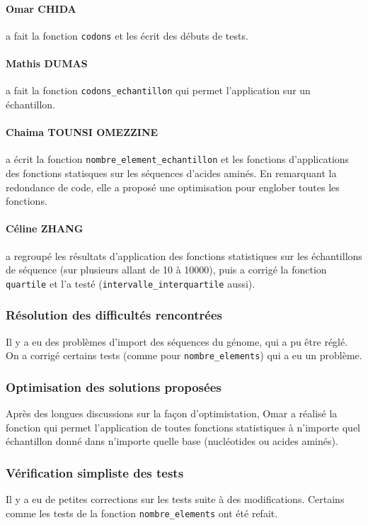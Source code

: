 \paragraph*{Omar CHIDA} a fait la fonction \texttt{codons} et les écrit des débuts de tests.

\paragraph*{Mathis DUMAS} a fait la fonction \texttt{codons\_echantillon} qui permet l'application sur un échantillon.

\paragraph*{Chaima TOUNSI OMEZZINE} a écrit la fonction \texttt{nombre\_element\_echantillon} et les fonctions d'applications des fonctions statisques sur les séquences d'acides aminés. En remarquant la redondance de code, elle a proposé une optimisation pour englober toutes les fonctions.

\paragraph*{Céline ZHANG} a regroupé les résultats d'application des fonctions statistiques sur les échantillons de séquence (sur plusieurs allant de 10 à 10000), puis a corrigé la fonction \texttt{quartile} et l'a testé (\texttt{intervalle\_interquartile} aussi).

\subsubsection*{Résolution des difficultés rencontrées}
Il y a eu des problèmes d'import des séquences du génome, qui a pu être réglé. On a corrigé certains tests (comme pour \texttt{nombre\_elements}) qui a eu un problème.

\subsubsection*{Optimisation des solutions proposées}
Après des longues discussions sur la façon d'optimistation, Omar a réalisé la fonction qui permet l'application de toutes fonctions statistiques à n'importe quel échantillon donné dans n'importe quelle base (nucléotides ou acides aminés).

\subsubsection*{Vérification simpliste des tests}
Il y a eu de petites corrections sur les tests suite à des modifications. Certains comme les tests de la fonction \texttt{nombre\_elements} ont été refait.

